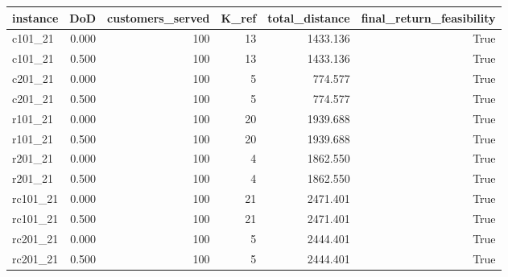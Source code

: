 \begin{tabular}{lrrrrr}
\toprule
instance & DoD & customers\_served & K\_ref & total\_distance & final\_return\_feasibility \\
\midrule
c101\_21 & 0.000 & 100 & 13 & 1433.136 & True \\
c101\_21 & 0.500 & 100 & 13 & 1433.136 & True \\
c201\_21 & 0.000 & 100 & 5 & 774.577 & True \\
c201\_21 & 0.500 & 100 & 5 & 774.577 & True \\
r101\_21 & 0.000 & 100 & 20 & 1939.688 & True \\
r101\_21 & 0.500 & 100 & 20 & 1939.688 & True \\
r201\_21 & 0.000 & 100 & 4 & 1862.550 & True \\
r201\_21 & 0.500 & 100 & 4 & 1862.550 & True \\
rc101\_21 & 0.000 & 100 & 21 & 2471.401 & True \\
rc101\_21 & 0.500 & 100 & 21 & 2471.401 & True \\
rc201\_21 & 0.000 & 100 & 5 & 2444.401 & True \\
rc201\_21 & 0.500 & 100 & 5 & 2444.401 & True \\
\bottomrule
\end{tabular}
